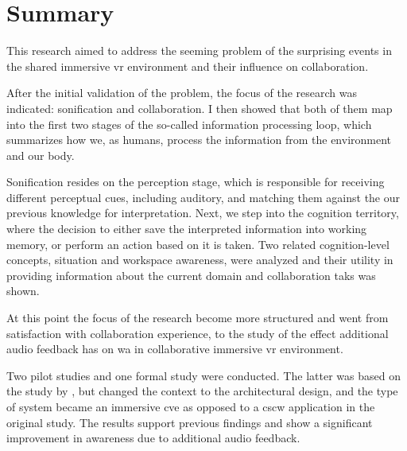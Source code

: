 
\chapter{Summary}

This research aimed to address the seeming problem of the surprising events in the shared immersive \gls{vr} environment and their influence on collaboration.

After the initial validation of the problem, the focus of the research was indicated: sonification and collaboration. I then showed that both of them map into the first two stages of the so-called information processing loop, which summarizes how we, as humans, process the information from the environment and our body.

Sonification resides on the perception stage, which is responsible for receiving different perceptual cues, including auditory, and matching them against the our previous knowledge for interpretation.
Next, we step into the cognition territory, where the decision to either save the interpreted information into working memory, or perform an action based on it is taken. 
Two related cognition-level concepts, situation and workspace awareness, were analyzed and their utility in providing information about the current domain and collaboration taks was shown.

At this point the focus of the research become more structured and went from satisfaction with collaboration experience, to the study of the effect additional audio feedback has on \gls{wa} in collaborative immersive \gls{vr} environment.

Two pilot studies and one formal study were conducted. The latter was based on the study by \cite{gutwin_chalk_2011}, but changed the context to the architectural design, and the type of system became an immersive \gls{cve} as opposed to a \gls{cscw} application in the original study. 
The results support previous findings and show a significant improvement in awareness due to additional audio feedback. %

